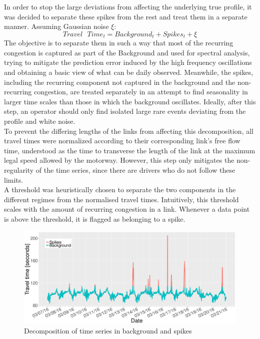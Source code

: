 \documentclass[conference]{IEEEtran}
\begin{document}
In order to stop the large deviations from affecting the underlying true profile, it was decided to separate these spikes from the rest and treat them in a separate manner. 
Assuming Gaussian noise $\xi$:
\begin{equation}
Travel \textrm{ } Time_t = Background_t + Spikes_t + \xi
\end{equation}
The objective is to separate them in such a way that most of the recurring congestion is captured as part of the Background and used for spectral analysis, trying to mitigate the prediction error induced by the high frequency oscillations and obtaining a basic view of what can be daily observed.
Meanwhile, the spikes, including the recurring component not captured in the background and the non-recurring congestion, are treated separately in an attempt to find seasonality in larger time scales than those in which the background oscillates. 
Ideally, after this step, an operator should only find isolated large rare events deviating from the profile and white noise.\\

To prevent the differing lengths of the links from affecting this decomposition, all travel times were normalized according to their corresponding link's free flow time, understood as the time to transverse the length of the link at the maximum legal speed allowed by the motorway. 
However, this step only mitigates the non-regularity of the time series, since there are drivers who do not follow these limits.\\

A threshold was heuristically chosen to separate the two components in the different regimes from the normalised travel times. 
Intuitively, this threshold scales with the amount of recurring congestion in a link. 
Whenever a data point is above the threshold, it is flagged as belonging to a spike.

\begin{figure}[htbp]
	\centering
	\includegraphics[width=0.95\linewidth]{BS.pdf}
	\caption{ Decomposition of time series in background and spikes }
	\label{fig:Background}
\end{figure}
\end{document}
